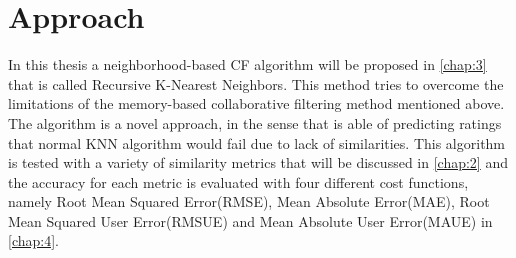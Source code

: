 \section{Approach}
In this thesis a neighborhood-based CF algorithm will be proposed in \autoref{chap:3}
that is called Recursive K-Nearest Neighbors. This method tries to overcome the limitations of
the memory-based collaborative filtering method mentioned above.
The algorithm is a novel approach, in the sense that is able of predicting ratings that
normal KNN algorithm would fail due to lack of
similarities. This algorithm is tested with a variety of similarity metrics that will
be discussed in \autoref{chap:2} and the accuracy for each metric is evaluated
with four different cost functions, namely Root Mean Squared Error(RMSE), Mean Absolute
Error(MAE), Root Mean Squared User Error(RMSUE) and Mean Absolute User
Error(MAUE) in \autoref{chap:4}.
